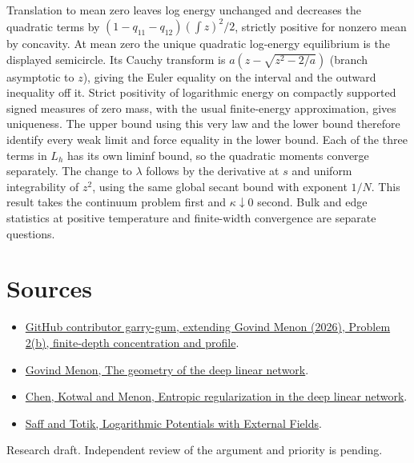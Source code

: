 \documentclass[10pt]{article}
\begin{document}
Translation to mean zero leaves log energy unchanged and decreases the quadratic terms by $(1-q_{11}-q_{12})(\int z)^2/2$, strictly positive for nonzero mean by concavity. At mean zero the unique quadratic log-energy equilibrium is the displayed semicircle. Its Cauchy transform is $a(z-\sqrt{z^2-2/a})$ (branch asymptotic to $z$), giving the Euler equality on the interval and the outward inequality off it. Strict positivity of logarithmic energy on compactly supported signed measures of zero mass, with the usual finite-energy approximation, gives uniqueness. The upper bound using this very law and the lower bound therefore identify every weak limit and force equality in the lower bound. Each of the three terms in $L_h$ has its own liminf bound, so the quadratic moments converge separately. The change to $\lambda$ follows by the derivative at $s$ and uniform integrability of $z^2$, using the same global secant bound with exponent $1/N$. This result takes the continuum problem first and $\kappa\downarrow0$ second. Bulk and edge statistics at positive temperature and finite-width convergence are separate questions.

\section*{Sources}
\begin{itemize}
\item \href{https://github.com/Math-for-AI-Safety/MAIS/issues/32}{GitHub contributor garry-gum, extending Govind Menon (2026), Problem 2(b), finite-depth concentration and profile}.
\item \href{https://arxiv.org/abs/2411.09004}{Govind Menon, The geometry of the deep linear network}.
\item \href{https://arxiv.org/abs/2512.06137}{Chen, Kotwal and Menon, Entropic regularization in the deep linear network}.
\item \href{https://doi.org/10.1007/978-3-662-03329-6}{Saff and Totik, Logarithmic Potentials with External Fields}.
\end{itemize}
{\small Research draft. Independent review of the argument and priority is pending.}
\end{document}
